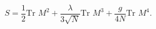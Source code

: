 \begin{equation}\label{action1}
    S=\frac{1}{2}\mbox{Tr }M^2+\frac{\lambda}{3\sqrt{N}}\mbox{Tr }M^3+\frac{g}{4N}\mbox{Tr }M^4.
\end{equation}

